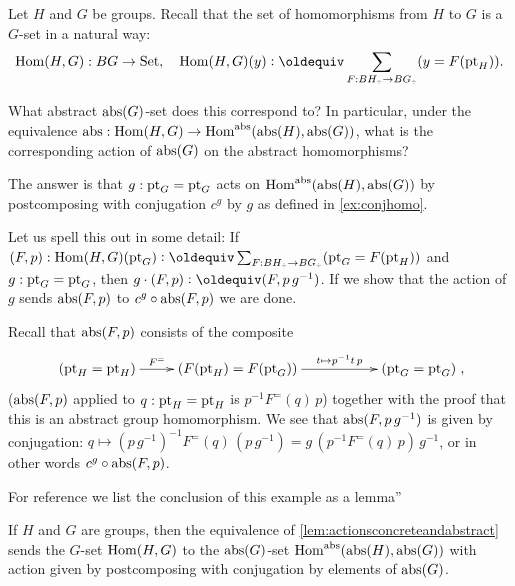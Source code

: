 \begin{example}
  \label{ex:abstrandconj}
  Let $H$ and $G$ be groups.  Recall that the set of homomorphisms from $H$ to $G$ is a $G$-set in a natural way:
$$\Hom(H,G):BG\to\Set,\quad \Hom(H,G)(y)\defequi \sum_{F:BH_\div\to BG_\div}(y=F(\pt_H)).$$

What abstract $\mathrm{abs}(G)$-set does this correspond to?
In particular, under the equivalence $\mathrm{abs}:\mathrm{Hom}(H,G)\to\mathrm{Hom}^{\mathrm{abs}}(\mathrm{abs}(H),\mathrm{abs}(G))$, what is the corresponding action of $\mathrm{abs}(G)$ on the abstract homomorphisms?

The answer is that $g:\mathrm{pt}_G=\mathrm{pt}_G$ acts on $\mathrm{Hom}^{\mathrm{abs}}(\mathrm{abs}(H),\mathrm{abs}(G))$ by postcomposing with conjugation $c^g$ by $g$ as defined in \cref{ex:conjhomo}.  

Let us spell this out in some detail:
If $(F,p):\Hom(H,G)(\pt_G)\defequi
 \sum_{F:BH_\div\to BG_\div}(\pt_G=F(\pt_H))$ and $g:\mathrm{pt}_G=\mathrm{pt}_G$, then $g\cdot(F,p)\defequi(F,p\,g^{-1})$.  If we show that the action of $g$ sends $\mathrm{abs}(F,p)$ to $c^g\circ\mathrm{abs}(F,p)$ we are done.

Recall that $\mathrm{abs}(F,p)$ consists of the composite 
$$\xymatrix{(\pt_H=\pt_H)\ar[r]^-{F^=}&(F(\pt_H)=F(\pt_G))\ar[rr]^-{t\mapsto p^{-1}t\,p}&&(\pt_G=\pt_G)},$$ 
(\ie $\mathrm{abs}(F,p)$ applied to $q:\mathrm{pt}_H=\mathrm{pt}_H $ is  $p^{-1}F^=(q)\,p$)  together with the proof that this is an abstract group homomorphism.  
We see that $\mathrm{abs}(F,p\,g^{-1})$ is given by conjugation:
$q\mapsto(p\,g^{-1})^{-1}F^=(q)\,(p\,g^{-1})=g\,(p^{-1}F^=(q)\,p)\,g^{-1}$, or in other words $c^g\circ\mathrm{abs}(F,p)$.
\end{example}
For reference we list the conclusion of this example as a lemma''
\begin{lemma}\label{lem:abstrandconj}
  If $H$ and $G$ are groups, then the equivalence of \cref{lem:actionsconcreteandabstract} sends the $G$-set $\mathrm{Hom}(H,G)$ to the $\mathrm{abs}(G)$-set $\mathrm{Hom}^{\mathrm{abs}}(\mathrm{abs}(H),\mathrm{abs}(G))$ with action given by postcomposing with conjugation by elements of $\mathrm{abs}(G)$.
\end{lemma}

